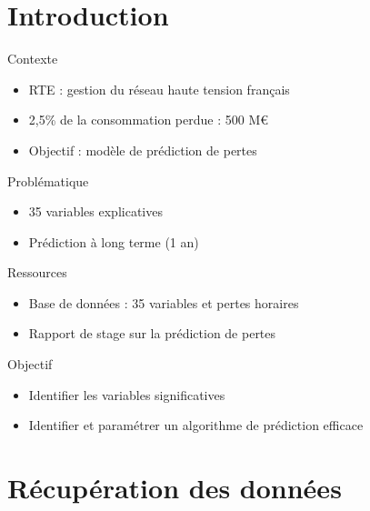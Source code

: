 \begin{frame}
\tableofcontents
\end{frame}

\hypertarget{introduction}{%
\section{Introduction}\label{introduction}}

\begin{frame}{Contexte}
\protect\hypertarget{contexte}{}
\begin{itemize}
\tightlist
\item
  RTE : gestion du réseau haute tension français
\item
  2,5\% de la consommation perdue : 500 M€
\item
  Objectif : modèle de prédiction de pertes
\end{itemize}
\end{frame}

\begin{frame}{Problématique}
\protect\hypertarget{probluxe9matique}{}
\begin{itemize}
\tightlist
\item
  35 variables explicatives
\item
  Prédiction à long terme (1 an)
\end{itemize}
\end{frame}

\begin{frame}{Ressources}
\protect\hypertarget{ressources}{}
\begin{itemize}
\tightlist
\item
  Base de données : 35 variables et pertes horaires
\item
  Rapport de stage sur la prédiction de pertes
\end{itemize}
\end{frame}

\begin{frame}{Objectif}
\protect\hypertarget{objectif}{}
\begin{itemize}
\tightlist
\item
  Identifier les variables significatives
\item
  Identifier et paramétrer un algorithme de prédiction efficace
\end{itemize}
\end{frame}

\hypertarget{ruxe9cupuxe9ration-des-donnuxe9es}{%
\section{Récupération des
données}\label{ruxe9cupuxe9ration-des-donnuxe9es}}

